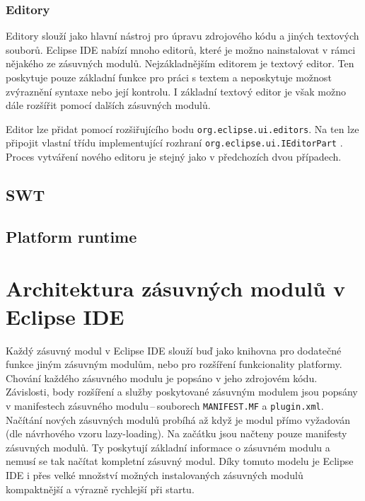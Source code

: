       \subsubsection{Editory}
      Editory slouží jako hlavní nástroj pro úpravu zdrojového kódu a jiných textových souborů. Eclipse IDE nabízí mnoho editorů, které je možno nainstalovat v rámci nějakého ze zásuvných modulů. Nejzákladnějším editorem je textový editor. Ten poskytuje pouze základní funkce pro práci s textem a neposkytuje možnost zvýraznění syntaxe nebo její kontrolu. I základní textový editor je však možno dále rozšířit pomocí dalších zásuvných modulů.

      Editor lze přidat pomocí rozšiřujícího bodu \texttt{org.eclipse.ui.editors}. Na ten lze připojit vlastní třídu implementující rozhraní \texttt{org.eclipse.ui.IEditorPart} \cite{Plugins}. Proces vytváření nového editoru je stejný jako v předchozích dvou případech.

    \subsection{SWT}
    
    \subsection{Platform runtime}

  \section{Architektura zásuvných modulů v Eclipse IDE}
  Každý zásuvný modul v Eclipse IDE slouží buď jako knihovna pro dodatečné funkce jiným zásuvným modulům, nebo pro rozšíření funkcionality platformy. Chování každého zásuvného modulu je popsáno v jeho zdrojovém kódu. Závislosti, body rozšíření a služby poskytované  zásuvným modulem jsou popsány v manifestech zásuvného modulu\,--\,souborech \texttt{MANIFEST.MF} a \texttt{plugin.xml}. Načítání nových zásuvných modulů probíhá až když je modul přímo vyžadován\,(dle návrhového vzoru lazy-loading). Na začátku jsou načteny pouze manifesty zásuvných modulů. Ty poskytují základní informace o zásuvném modulu a nemusí se tak načítat kompletní zásuvný modul. Díky tomuto modelu je Eclipse IDE i přes velké množství možných instalovaných zásuvných modulů kompaktnější a výrazně rychlejší při startu.

